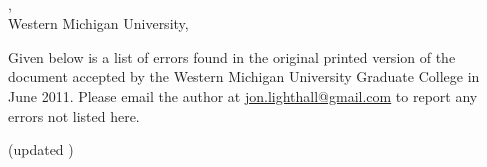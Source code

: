 \providecommand{\code}[1]{{\color{note_gray}#1}}
\cleardoublepage
{}
{}
\sloppy
\pagestyle{empty}
\begin{singlespace}%
\begin{center}
\vspace*{\titleskip}
\thesistitle\\
\vspace*{2.0\baselineskip}%
\authname, \degree\\
\vspace*{1.0\baselineskip}%
Western Michigan University, \abstdate{}%
\vspace*{1.0\baselineskip}%
\end{center}%

\label{errata_page}
Given below is a list of errors found in the original printed version of the document accepted by the Western Michigan University Graduate College in June 2011.  Please email the author at \href{mailto:jon.lighthall@gmail.com}{jon.lighthall@gmail.com} to report any errors not listed here.
\vspace{-4pt}%
\begin{itemize}
\setlength{\itemsep}{-2pt}%
  
\end{itemize}
\end{singlespace}
\centering
{}
(updated )